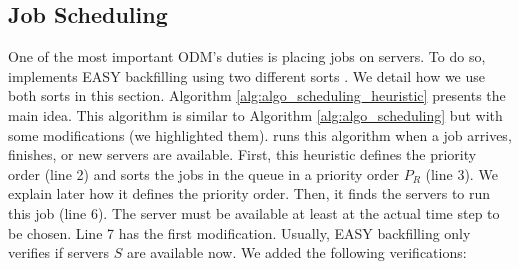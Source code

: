 \subsection{Job Scheduling}
\label{sec:model_easy}

One of the most important ODM's duties is placing jobs on servers. To do so, \emph{\systemName} implements EASY backfilling using two different sorts \cite{mu2001utilization, lelong2018tuning}. We detail how we use both sorts in this section. Algorithm \ref{alg:algo_scheduling_heuristic} presents the main idea. This algorithm is similar to Algorithm \ref{alg:algo_scheduling} but with some modifications (we highlighted them). \emph{\systemName} runs this algorithm when a job arrives, finishes, or new servers are available. First, this heuristic defines the priority order (line 2) and sorts the jobs in the queue in a priority order $P_{R}$ (line 3). We explain later how it defines the priority order. Then, it finds the servers to run this job (line 6). The server must be available at least at the actual time step to be chosen. Line 7 has the first modification. Usually, EASY backfilling only verifies if servers $S$ are available now. We added the following verifications:

